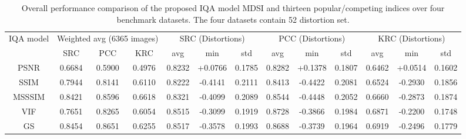 \begin{table*}[htb]
\caption{Overall performance comparison of the proposed IQA model MDSI and thirteen popular/competing indices over four benchmark datasets. The four datasets contain 52 distortion set.}
\scriptsize
\centering
\begin{tabular}{c|ccc|l|ccc|ccc|ccc}
\hline
\multirow{2}{*}{IQA model} & \multicolumn{4}{c|}{Weighted avg (6365 images)}                              & \multicolumn{3}{c|}{SRC (Distortions)}               & \multicolumn{3}{c|}{PCC (Distortions)}               & \multicolumn{3}{c}{KRC (Distortions)}                \\ \cline{2-14} 
                           & SRC               & PCC               & \multicolumn{2}{c|}{KRC}             & avg             & min              & std             & avg             & min              & std             & avg             & min              & std             \\ \hline
PSNR                       & 0.6684            & 0.5900            & \multicolumn{2}{c|}{0.4976}          & 0.8232          & +0.0766          & 0.1785          & 0.8282          & +0.1378 & 0.1807          & 0.6462          & +0.0514          & 0.1602          \\
SSIM \cite{SSIM}                       & 0.7944            & 0.8141            & \multicolumn{2}{c|}{0.6110}          & 0.8222          & -0.4141          & 0.2111          & 0.8413          & -0.4422          & 0.2081          & 0.6524          & -0.2930          & 0.1856          \\
MSSSIM \cite{MSSSIM}                     & 0.8421            & 0.8596            & \multicolumn{2}{c|}{0.6618}          & 0.8321          & -0.4099          & 0.2089          & 0.8544          & -0.4448          & 0.2052          & 0.6660          & -0.2873          & 0.1874          \\
VIF \cite{VIF}                        & 0.7651            & 0.8265            & \multicolumn{2}{c|}{0.6054}          & 0.8515          & -0.3099          & 0.1919          & 0.8728 & -0.3866          & 0.1984          & 0.6871          & -0.2200          & 0.1748          \\
GS \cite{GS}                         & 0.8454            & 0.8651            & \multicolumn{2}{c|}{0.6255}          & 0.8517          & -0.3578          & 0.1993          & 0.8688          & -0.3739          & 0.1964          & 0.6919          & -0.2496          & 0.1779          \\

\end{tabular}
\end{table*}
